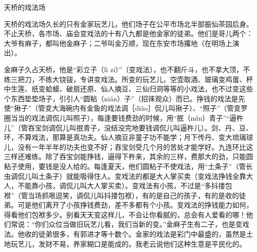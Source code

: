 \documentclass[12pt,UTF8]{ctexbook}
\begin{document}
天桥的戏法场


天桥的戏法场久长的只有金家玩艺儿，他们场子在公平市场北半部振仙茶园后身。不止天桥，各市场、庙会变戏法的十有八九都是他金家的徒弟。他们是哥儿两个：大爷有麻子，都叫他金麻子；二爷叫金万顺，现在东安市场撂地（在明场上演出）。

金麻子久占天桥，他是“彩立子（lì zi）”（变戏法），也不翻斤斗，也不拿大顶，不练三把刀，不练大铙钹，专讲变戏法。所变的玩艺儿，空壶取酒、玻璃变鸡蛋、杯中生莲、纸变蛤蟆、破扇还原、仙人摘豆、三仙归洞等等的小戏法，也不过变这些个东西垫垫场子，引引人“圆粘（nián）子”（招徕观众）而已。挣钱的戏法是先使“揪子”（管变大海碗内有金鱼的戏法调［diào］侃儿叫揪子）、“照子”（管变罗圈当当的戏法调侃儿叫照子），每逢要钱费劲的时候，用“抿（mǐn）青子”“逼杵儿”（管吞宝剑调侃儿叫抿青子，没结没完地要钱调侃儿叫逼杵儿）。剑、丹、豆、环，不算戏法，那算是真功夫。仙人摘豆非童子功不能学；月下传丹、变大琉璃球儿，没有一年半年的功夫也变不好；吞宝剑受几个月的苦处才能学好。九连环比这三样还难练。除了吞宝剑能挣钱，逼得下杵来，其余的三样，费那大的劲，只能圆粘子使用，要钱是没人给的。每逢夏天，他们圆粘子不使戏法，用“土条子”（管长虫调侃儿叫土条子）就能吸得住人。变戏法的都是大人掌买卖（变戏法挣钱全靠大人，不能靠小孩，调侃儿叫大人掌买卖）。变戏法有小孩，不过是“多抖搂包袱”（管当场抓哏逗笑，调侃儿叫抖搂包袱），有的是自己的孩子，有的是收的徒弟。可是他们离开了小孩挣钱费劲，差不多都有个小孩。变戏法的挣钱能力如何，得看他们包袱多少。别看天天变这样儿，不会让你看腻的，总会有人爱看的哪！他们常说：“你们众位当做旧玩艺儿看，我们当新的变。”金麻子生有二子，也是变戏法。他收的徒弟很多，有郭进才等十数个。金家的戏法是彩门中最盛的，虽然是土地玩艺儿，发财不易，养家糊口是能成的。我老云说他们这种生意是平民化的。
\end{document}
